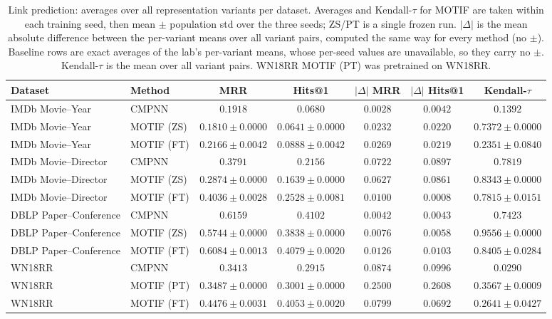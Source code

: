 \begin{table}[t]
\centering
\small
\begin{tabular}{||l||l||c|c||c|c||c||}
\hline
\textbf{Dataset} & \textbf{Method} & \textbf{MRR} & \textbf{Hits@1} & \textbf{$|\Delta|$ MRR} & \textbf{$|\Delta|$ Hits@1} & \textbf{Kendall-$\tau$} \\
\hline\hline
IMDb Movie--Year & CMPNN & $0.1918$ & $0.0680$ & $0.0028$ & $0.0042$ & $0.1392$ \\
\hline
IMDb Movie--Year & MOTIF (ZS) & $0.1810 \pm 0.0000$ & $0.0641 \pm 0.0000$ & $0.0232$ & $0.0220$ & $0.7372 \pm 0.0000$ \\
\hline
IMDb Movie--Year & MOTIF (FT) & $0.2166 \pm 0.0042$ & $0.0888 \pm 0.0042$ & $0.0269$ & $0.0219$ & $0.2351 \pm 0.0840$ \\
\hline
\hline
IMDb Movie--Director & CMPNN & $0.3791$ & $0.2156$ & $0.0722$ & $0.0897$ & $0.7819$ \\
\hline
IMDb Movie--Director & MOTIF (ZS) & $0.2874 \pm 0.0000$ & $0.1639 \pm 0.0000$ & $0.0627$ & $0.0861$ & $0.8343 \pm 0.0000$ \\
\hline
IMDb Movie--Director & MOTIF (FT) & $0.4036 \pm 0.0028$ & $0.2528 \pm 0.0081$ & $0.0100$ & $0.0008$ & $0.7815 \pm 0.0151$ \\
\hline
\hline
DBLP Paper--Conference & CMPNN & $0.6159$ & $0.4102$ & $0.0042$ & $0.0043$ & $0.7423$ \\
\hline
DBLP Paper--Conference & MOTIF (ZS) & $0.5744 \pm 0.0000$ & $0.3838 \pm 0.0000$ & $0.0076$ & $0.0058$ & $0.9556 \pm 0.0000$ \\
\hline
DBLP Paper--Conference & MOTIF (FT) & $0.6084 \pm 0.0013$ & $0.4079 \pm 0.0020$ & $0.0126$ & $0.0103$ & $0.8405 \pm 0.0284$ \\
\hline
\hline
WN18RR & CMPNN & $0.3413$ & $0.2915$ & $0.0874$ & $0.0996$ & $0.0290$ \\
\hline
WN18RR & MOTIF (PT) & $0.3487 \pm 0.0000$ & $0.3001 \pm 0.0000$ & $0.2500$ & $0.2608$ & $0.3567 \pm 0.0009$ \\
\hline
WN18RR & MOTIF (FT) & $0.4476 \pm 0.0031$ & $0.4053 \pm 0.0020$ & $0.0799$ & $0.0692$ & $0.2641 \pm 0.0427$ \\
\hline
\end{tabular}
\caption{Link prediction: averages over all representation variants per dataset. Averages and Kendall-$\tau$ for MOTIF are taken within each training seed, then mean $\pm$ population std over the three seeds; ZS/PT is a single frozen run. $|\Delta|$ is the mean absolute difference between the per-variant means over all variant pairs, computed the same way for every method (no $\pm$). Baseline rows are exact averages of the lab's per-variant means, whose per-seed values are unavailable, so they carry no $\pm$. Kendall-$\tau$ is the mean over all variant pairs. WN18RR MOTIF (PT) was pretrained on WN18RR.}
\label{tab:overview_lp}
\end{table}
